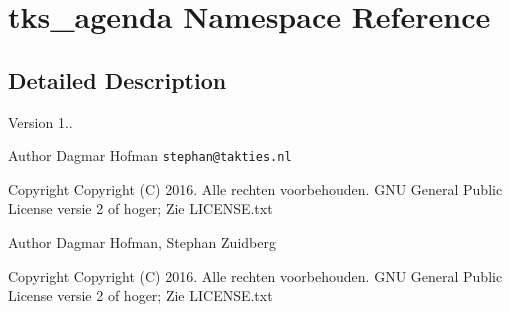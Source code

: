 \section{tks\+\_\+agenda Namespace Reference}
\label{namespacetks__agenda}


\subsection{Detailed Description}
\begin{DoxyVersion}{Version}
1..
\end{DoxyVersion}
\begin{DoxyAuthor}{Author}
Dagmar Hofman {\tt stephan@takties.\+nl} 
\end{DoxyAuthor}
\begin{DoxyCopyright}{Copyright}
Copyright (C) 2016. Alle rechten voorbehouden.  G\+NU General Public License versie 2 of hoger; Zie L\+I\+C\+E\+N\+S\+E.\+txt
\end{DoxyCopyright}
\begin{DoxyAuthor}{Author}
Dagmar Hofman, Stephan Zuidberg 
\end{DoxyAuthor}
\begin{DoxyCopyright}{Copyright}
Copyright (C) 2016. Alle rechten voorbehouden.  G\+NU General Public License versie 2 of hoger; Zie L\+I\+C\+E\+N\+S\+E.\+txt 
\end{DoxyCopyright}
